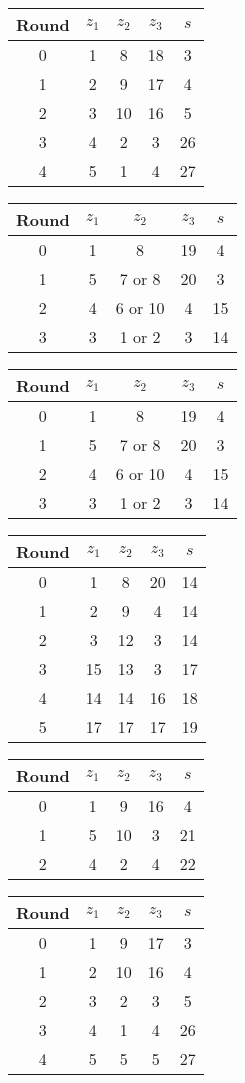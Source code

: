 \begin{multicols}{2}
\begin{tabular}{c | c | c | c | c }
Round & $z_1$ & $z_2$ & $z_3$ & $s$ \\
\hline
0 & 1 & 8 & 18 & 3 \\
1 & 2 & 9 & 17 & 4 \\
2 & 3 & 10 & 16 & 5 \\
3 & 4 & 2 & 3 & 26 \\
4 & 5 & 1 & 4 & 27
\end{tabular}


\begin{tabular}{c | c | c | c | c }
Round & $z_1$ & $z_2$ & $z_3$ & $s$ \\
\hline
0 & 1 & 8 & 19 & 4 \\
1 & 5 & 7 or 8 & 20 & 3 \\
2 & 4 & 6 or 10 & 4 & 15 \\
3 & 3 & 1 or 2 & 3 & 14
\end{tabular}


\begin{tabular}{c | c | c | c | c }
Round & $z_1$ & $z_2$ & $z_3$ & $s$ \\
\hline
0 & 1 & 8 & 19 & 4 \\
1 & 5 & 7 or 8 & 20 & 3 \\
2 & 4 & 6 or 10 & 4 & 15 \\
3 & 3 & 1 or 2 & 3 & 14
\end{tabular}


\begin{tabular}{c | c | c | c | c }
Round & $z_1$ & $z_2$ & $z_3$ & $s$ \\
\hline
0 & 1 & 8 & 20 & 14 \\
1 & 2 & 9 & 4 & 14 \\
2 & 3 & 12 & 3 & 14 \\
3 & 15 & 13 & 3 & 17 \\
4 & 14 & 14 & 16 & 18 \\
5 & 17 & 17 & 17 & 19
\end{tabular}


\begin{tabular}{c | c | c | c | c }
Round & $z_1$ & $z_2$ & $z_3$ & $s$ \\
\hline
0 & 1 & 9 & 16 & 4 \\
1 & 5 & 10 & 3 & 21 \\
2 & 4 & 2 & 4 & 22
\end{tabular}


\begin{tabular}{c | c | c | c | c }
Round & $z_1$ & $z_2$ & $z_3$ & $s$ \\
\hline
0 & 1 & 9 & 17 & 3 \\
1 & 2 & 10 & 16 & 4 \\
2 & 3 & 2 & 3 & 5 \\
3 & 4 & 1 & 4 & 26 \\
4 & 5 & 5 & 5 & 27
\end{tabular}



\end{multicols}
